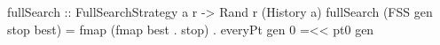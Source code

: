 fullSearch :: FullSearchStrategy a r -> Rand r (History a)
fullSearch (FSS gen stop best) = fmap (fmap best . stop) . everyPt gen 0 =<< pt0 gen
